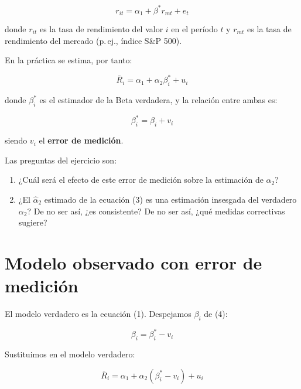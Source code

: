 \documentclass[12pt,letterpaper]{article}
\begin{document}
\begin{equation}
r_{it} = \alpha_{1} + \beta^{*} r_{mt} + e_{t}
\end{equation}

donde $r_{it}$ es la tasa de rendimiento del valor $i$ en el período
$t$ y $r_{mt}$ es la tasa de rendimiento del mercado (p.\,ej., índice
S\&P 500).

En la práctica se estima, por tanto:

\begin{equation}
\bar{R}_{i} = \alpha_{1} + \alpha_{2}\beta_{i}^{*} + u_{i}
\end{equation}

donde $\beta_{i}^{*}$ es el estimador de la Beta verdadera, y la
relación entre ambas es:

\begin{equation}
\beta_{i}^{*} = \beta_{i} + v_{i}
\end{equation}

siendo $v_{i}$ el \textbf{error de medición}.

\bigskip

\noindent Las preguntas del ejercicio son:

\begin{enumerate}[leftmargin=1.8em,label=\alph*)]
\item ¿Cuál será el efecto de este error de medición sobre la
      estimación de $\alpha_{2}$?
\item ¿El $\hat{\alpha}_{2}$ estimado de la ecuación (3) es una
      estimación insesgada del verdadero $\alpha_{2}$? De no ser así,
      ¿es consistente? De no ser así, ¿qué medidas correctivas sugiere?
\end{enumerate}

\section{Modelo observado con error de medición}

El modelo verdadero es la ecuación (1). Despejamos $\beta_{i}$ de (4):

\begin{equation}
\beta_{i} = \beta_{i}^{*} - v_{i}
\end{equation}

Sustituimos en el modelo verdadero:

\begin{equation}
\bar{R}_{i}
= \alpha_{1} + \alpha_{2}(\beta_{i}^{*} - v_{i}) + u_{i}
\end{equation}
\end{document}
